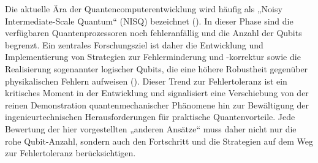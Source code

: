 \newline \newline
Die aktuelle Ära der Quantencomputerentwicklung wird häufig als „Noisy \linebreak Intermediate-Scale Quantum“ (NISQ) bezeichnet (\cite{chengNoisyIntermediatescaleQuantum2023}). In dieser Phase sind die verfügbaren Quantenprozessoren noch fehleranfällig und die Anzahl der Qubits begrenzt. Ein zentrales Forschungsziel ist daher die Entwicklung und Implementierung von Strategien zur Fehlerminderung und -korrektur sowie die Realisierung sogenannter logischer Qubits, die eine höhere Robustheit gegenüber physikalischen Fehlern aufweisen (\cite{QuantumHardwareExplained}). Dieser Trend zur Fehlertoleranz ist ein kritisches Moment in der Entwicklung und signalisiert eine Verschiebung von der reinen Demonstration quantenmechanischer Phänomene hin zur Bewältigung der ingenieurtechnischen Herausforderungen für praktische Quantenvorteile. Jede Bewertung der hier vorgestellten „anderen Ansätze“ muss daher nicht nur die rohe Qubit-Anzahl, sondern auch den Fortschritt und die Strategien auf dem Weg zur Fehlertoleranz berücksichtigen.



% 

